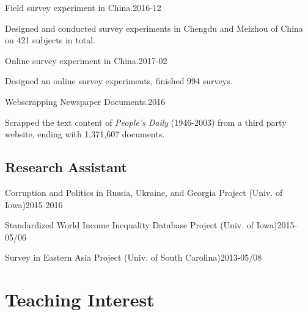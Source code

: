 \documentclass[10.5pt,]{article}
\providecommand{\tightlist}{%
  \setlength{\itemsep}{0pt}\setlength{\parskip}{0pt}}
\renewenvironment{itemize}{
  \begin{list}{}{
    \setlength{\leftmargin}{1.5em}
  }
}{
  \end{list}
}
\begin{document}
\begin{itemize}
\tightlist
\item
  Field survey experiment in China.\hfill 2016-12

  \begin{itemize}
  \tightlist
  \item
    \footnotesize Designed and conducted survey experiments in Chengdu
    and Meizhou of China on 421 subjects in total.
  \end{itemize}
\item
  Online survey experiment in China.\hfill 2017-02

  \begin{itemize}
  \tightlist
  \item
    \footnotesize Designed an online survey experiments, finished 994
    surveys.
  \end{itemize}
\item
  Webscrapping Newspaper Documents.\hfill 2016

  \begin{itemize}
  \tightlist
  \item
    \footnotesize Scrapped the text content of \emph{People's Daily}
    (1946-2003) from a third party website, ending with 1,371,607
    documents.
  \end{itemize}
\end{itemize}

\subsection{Research Assistant}\label{research-assistant}

\begin{itemize}
\tightlist
\item
  Corruption and Politics in Russia, Ukraine, and Georgia Project (Univ.
  of Iowa)\hfill 2015-2016
\item
  Standardized World Income Inequality Database Project (Univ. of
  Iowa)\hfill 2015-05/06
\item
  Survey in Eastern Asia Project (Univ. of South
  Carolina)\hfill 2013-05/08
\end{itemize}

\section{Teaching Interest}\label{teaching-interest}
\end{document}
